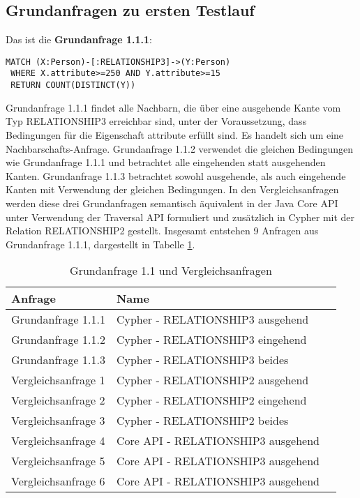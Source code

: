 \subsection{Grundanfragen zu ersten Testlauf}
Das ist die \textbf{Grundanfrage 1.1.1}: 
\begin{Verbatim}[frame=single]
 MATCH (X:Person)-[:RELATIONSHIP3]->(Y:Person) 
 WHERE X.attribute>=250 AND Y.attribute>=15  
 RETURN COUNT(DISTINCT(Y))
\end{Verbatim} 
Grundanfrage 1.1.1 findet alle Nachbarn, die über eine ausgehende Kante vom Typ RELATIONSHIP3 erreichbar sind, unter der Voraussetzung, dass  Bedingungen für die Eigenschaft attribute erfüllt sind. Es handelt sich um eine Nachbarschafts-Anfrage.
 Grundanfrage 1.1.2 verwendet die gleichen Bedingungen wie Grundanfrage 1.1.1 und betrachtet alle eingehenden statt ausgehenden Kanten. Grundanfrage 1.1.3 betrachtet sowohl ausgehende, als auch eingehende Kanten mit Verwendung der gleichen Bedingungen. In den Vergleichsanfragen werden diese drei Grundanfragen semantisch äquivalent in der Java Core API unter Verwendung der Traversal API formuliert und zusätzlich in Cypher mit der Relation RELATIONSHIP2 gestellt. Insgesamt entstehen 9 Anfragen aus Grundanfrage 1.1.1, dargestellt in Tabelle \ref{tab:Intro_Query2_1}.
\FloatBarrier
\begin{table}[h]
	\centering
	\begin{tabular}{ |p{5cm}||p{7cm}|p{3cm}  }
		\hline
		Anfrage& Name\\
		\hline
		Grundanfrage 1.1.1 &  Cypher - RELATIONSHIP3 ausgehend\\
		Grundanfrage 1.1.2 &  Cypher - RELATIONSHIP3 eingehend\\
		Grundanfrage 1.1.3 &  Cypher - RELATIONSHIP3 beides\\
		Vergleichsanfrage 1 &  Cypher - RELATIONSHIP2 ausgehend\\
		Vergleichsanfrage 2 &  Cypher - RELATIONSHIP2 eingehend\\
		Vergleichsanfrage 3 &  Cypher - RELATIONSHIP2 beides\\
		Vergleichsanfrage 4 &  Core API - RELATIONSHIP3 ausgehend\\
		Vergleichsanfrage 5 &  Core API - RELATIONSHIP3 ausgehend\\
		Vergleichsanfrage 6 &  Core API - RELATIONSHIP3 ausgehend\\
		\hline
	\end{tabular}
	\caption{Grundanfrage 1.1 und Vergleichsanfragen}
	\label{tab:Intro_Query2_1}
\end{table}
\FloatBarrier

